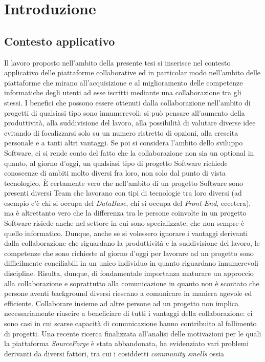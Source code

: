 \chapter{Introduzione}

\section{Contesto applicativo} %
Il lavoro proposto nell'ambito della presente tesi si inserisce nel contesto applicativo delle piattaforme collaborative ed in particolar modo nell'ambito delle piattaforme che mirano all'acquisizione e al miglioramento delle competenze informatiche degli utenti ad esse iscritti mediante una collaborazione tra gli stessi. I benefici che possono essere ottenuti dalla collaborazione nell'ambito di progetti di qualsiasi tipo sono innumerevoli: si può pensare all'aumento della produttività, alla suddivisione del lavoro, alla possibilità di valutare diverse idee evitando di focalizzarsi solo su un numero ristretto di opzioni, alla crescita personale e a tanti altri vantaggi. Se poi si considera l'ambito dello sviluppo Software, ci si rende conto del fatto che la collaborazione non sia un optional in quanto, al giorno d'oggi, un qualsiasi tipo di progetto Software richiede conoscenze di ambiti molto diversi fra loro, non solo dal punto di vista tecnologico. È certamente vero che nell'ambito di un progetto Software sono presenti diversi Team che lavorano con tipi di tecnologie tra loro diversi (ad esempio c'è chi si occupa del \emph{DataBase}, chi si occupa del \emph{Front-End}, eccetera), ma è altrettanto vero che la differenza tra le persone coinvolte in un progetto Software risiede anche nel settore in cui sono specializzate, che non sempre è quello informatico. Dunque, anche se si volessero ignorare i vantaggi derivanti dalla collaborazione che riguardano la produttività e la suddivisione del lavoro, le competenze che sono richieste al giorno d'oggi per lavorare ad un progetto sono difficilmente conciliabili in un unico individuo in quanto riguardano innumerevoli discipline. Risulta, dunque, di fondamentale importanza maturare un approccio alla collaborazione e soprattutto alla comunicazione in quanto non è scontato che persone aventi background diversi riescano a comunicare in maniera agevole ed efficiente. Collaborare insieme ad altre persone ad un progetto non implica necessariamente riuscire a beneficiare di tutti i vantaggi della collaborazione: ci sono casi in cui scarse capacità di comunicazione hanno contribuito al fallimento di progetti. Una recente ricerca \cite{SourceForge} finalizzata all'analisi delle motivazioni per le quali la piattaforma \emph{SourceForge} è stata abbandonata, ha evidenziato vari problemi derivanti da diversi fattori, tra cui i cosiddetti \emph{community smells} ossia 
